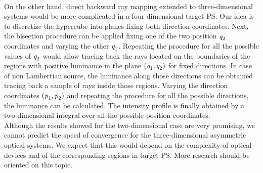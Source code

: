 %
\\ \indent 
On the other hand, direct backward ray mapping extended to three-dimensional systems would be more complicated in a four dimensional target PS. Our idea is to discretize the hypercube into planes fixing both direction coordinates. Next, the bisection procedure can be applied fixing one of the two position $\textit{q}_2$ coordinates and varying the other $\textit{q}_1$. Repeating the procedure for all the possible values of $\textit{q}_2$ would allow tracing back the rays located on the boundaries of the regions with positive luminance in the plane $(\textit{q}_1, \textit{q}_2)$ for fixed directions. In case of non Lambertian source, the luminance along those directions can be obtained tracing back a sample of rays inside those regions. Varying the direction coordinates $(\textit{p}_1, \textit{p}_2)$ and repeating the procedure for all the possible directions, the luminance can be calculated. The intensity profile is finally obtained by a two-dimensional integral over all the possible position coordinates. 
\\ \indent 
Although the results showed for the two-dimensional case are very promising, we cannot predict the speed of convergence for the three-dimensional asymmetric optical systems. We expect that this would depend on the complexity of optical devices and of the corresponding regions in target PS. More research should be oriented on this topic.
